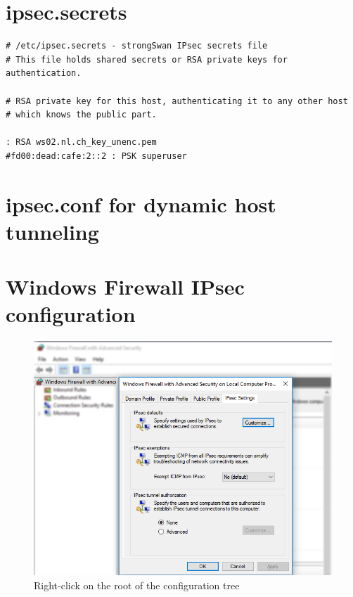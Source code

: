 \documentclass[a4paper]{report}
\begin{document}
\section{ipsec.secrets}
\label{app-sec:ipsec.secrets-P2P}
\begin{lstlisting}
# /etc/ipsec.secrets - strongSwan IPsec secrets file
# This file holds shared secrets or RSA private keys for authentication.

# RSA private key for this host, authenticating it to any other host
# which knows the public part.

: RSA ws02.nl.ch_key_unenc.pem
#fd00:dead:cafe:2::2 : PSK superuser
\end{lstlisting}

\section{ipsec.conf for dynamic host tunneling}
\label{app-sec:WorkingConf}

\section{Windows Firewall IPsec configuration}
\label{app-sec:WinIPsecConf}

\begin{figure}[h!]
	\includegraphics[width=\linewidth,keepaspectratio]{IPsec_Defaults}
	\caption{Right-click on the root of the configuration tree}
\end{figure}
\end{document}
